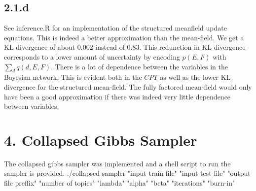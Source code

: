 \documentclass{article}
\begin{document}
\subsection*{2.1.d}
See inference.R for an implementation of the structured meanfield
update equations. This is indeed a better approximation than the mean-field. We get a KL divergence of about 0.002 instead of 0.83. This redunction in KL divergence corresponds to a lower amount of uncertainty by encoding $p(E,F)$ with $\sum_{d} q(d,E,F)$. There is a lot of 
dependence between the variables in the Bayesian network. This
is evident both in the $CPT$ as well as the lower KL divergence for
the structured mean-field. The fully factored mean-field would only
have been a good approximation if there was indeed very little
dependence between variables.

\section*{4. Collapsed Gibbs Sampler}
The collapsed gibbs sampler was implemented and a shell script to run the sampler is provided.
./collapsed-sampler "input train file" "input test file" "output file preffix" "number of topics" "lambda" "alpha" "beta" "iterations" "burn-in"
\end{document}

